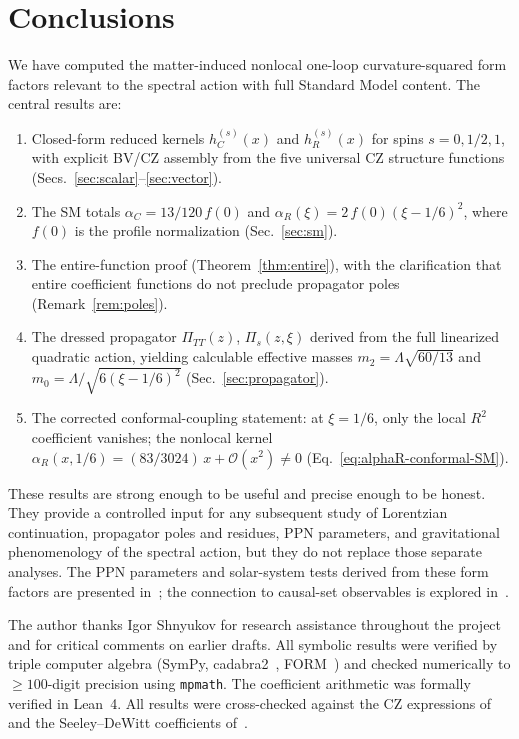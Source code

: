 \documentclass[aps,prd,twocolumn,superscriptaddress,nofootinbib,floatfix]{revtex4-2}
\theoremstyle{definition}
\theoremstyle{remark}
\begin{document}
\section{Conclusions}
\label{sec:conclusions}

We have computed the matter-induced nonlocal one-loop curvature-squared form
factors relevant to the spectral action with full Standard Model content. The
central results are:

\begin{enumerate}
\item Closed-form reduced kernels $h_C^{(s)}(x)$ and $h_R^{(s)}(x)$ for
  spins $s = 0, 1/2, 1$, with explicit BV/CZ assembly from the five
  universal CZ structure functions (Secs.~\ref{sec:scalar}--\ref{sec:vector}).
\item The SM totals $\alpha_C = 13/120\,f(0)$ and
  $\alpha_R(\xi) = 2\,f(0)(\xi - 1/6)^2$, where $f(0)$ is the profile
  normalization (Sec.~\ref{sec:sm}).
\item The entire-function proof (Theorem~\ref{thm:entire}), with the
  clarification that entire coefficient functions do not preclude propagator
  poles (Remark~\ref{rem:poles}).
\item The dressed propagator $\Pi_{TT}(z)$, $\Pi_s(z,\xi)$ derived from the
  full linearized quadratic action, yielding calculable effective masses
  $m_2 = \Lambda\sqrt{60/13}$ and
  $m_0 = \Lambda/\sqrt{6(\xi - 1/6)^2}$ (Sec.~\ref{sec:propagator}).
\item The corrected conformal-coupling statement: at $\xi = 1/6$, only the
  local $R^2$ coefficient vanishes; the nonlocal kernel
  $\alpha_R(x, 1/6) = (83/3024)\,x + \mathcal{O}(x^2) \neq 0$
  (Eq.~\eqref{eq:alphaR-conformal-SM}).
\end{enumerate}

These results are strong enough to be useful and precise enough to be
honest. They provide a controlled input for any subsequent study of
Lorentzian continuation, propagator poles and residues, PPN parameters, and
gravitational phenomenology of the spectral action, but they do not replace
those separate analyses. The PPN parameters and solar-system tests derived
from these form factors are presented in~\cite{Alfyorov:2026sct2}; the connection to causal-set observables
is explored in~\cite{Alfyorov:2026sct7}.


\begin{acknowledgments}
The author thanks Igor Shnyukov for research assistance throughout the
project and for critical comments on earlier drafts.
All symbolic results were verified by triple computer algebra
(SymPy, cadabra2~\cite{Peeters:2007wn}, FORM~\cite{Vermaseren:2000nd})
and checked numerically to $\geq 100$-digit precision using
\texttt{mpmath}. The coefficient arithmetic was formally verified in
Lean~4. All results were cross-checked against the CZ
expressions of~\cite{Codello:2012kq} and the Seeley--DeWitt
coefficients of~\cite{Vassilevich:2003xt,Avramidi:2000bm}.
\end{acknowledgments}
\end{document}
